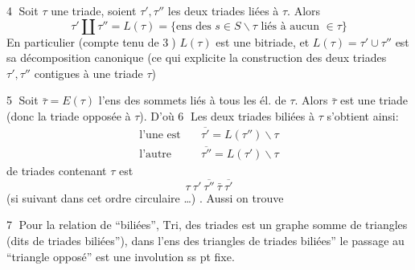 \textcircled{\scriptsize 4} Soit $\tau$ une triade, soient $\tau',\tau''$ les deux triades liées à $\tau$. Alors
\[
\tau'\amalg\tau''=L(\tau)=\{\text{ens des }s\in S\smallsetminus\tau\text{ liés à aucun }\in\tau\}
\tag*{a)}
\]
 En particulier (compte tenu de \textcircled{\scriptsize 3}) $L(\tau)$ est une bitriade, et $L(\tau)=\tau'\cup\tau''$ est sa décomposition canonique
(ce qui explicite la construction des deux triades $\tau',\tau''$ contigues à une triade $\tau$)

\textcircled{\scriptsize 5} Soit $\bar\tau=E(\tau)$ l'ens des sommets liés à tous les él. de $\tau$. Alors $\bar\tau$ est une triade (donc la triade opposée à $\tau$).
D'où \textcircled{\scriptsize 6} Les deux triades biliées à $\tau$ s'obtient ainsi:
\[
\begin{aligned}
\text{l'une est}\quad&\overline{\tau'}=L(\tau'')\smallsetminus\tau\\
\text{l'autre}\quad&\overline{\tau''}=L(\tau')\smallsetminus\tau
\end{aligned}
\]
 de triades contenant $\tau$ est \deleted{\unsure{$\xi$}}
\[
\tau\ \tau'\ \overline{\tau''}\ \bar\tau\ \overline{\tau'}
\]
(si suivant dans cet ordre circulaire \ldots) . Aussi on trouve

\textcircled{\scriptsize 7} Pour la relation de ``biliées'',   $\mathrm{Tri}$,  des triades est un graphe somme de triangles (dits   de triades biliées''), dans l'ens des triangles de triades biliées''  le passage au ``triangle opposé'' est une involution ss pt fixe.

